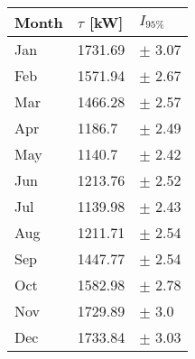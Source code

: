 \begin{tabular}{lll}
\toprule
Month & $\tau$ [kW] &   $I_{95\%}$ \\
\midrule
  Jan &     1731.69 &   $\pm$ 3.07 \\
  Feb &     1571.94 &   $\pm$ 2.67 \\
  Mar &     1466.28 &   $\pm$ 2.57 \\
  Apr &      1186.7 &   $\pm$ 2.49 \\
  May &      1140.7 &   $\pm$ 2.42 \\
  Jun &     1213.76 &   $\pm$ 2.52 \\
  Jul &     1139.98 &   $\pm$ 2.43 \\
  Aug &     1211.71 &   $\pm$ 2.54 \\
  Sep &     1447.77 &   $\pm$ 2.54 \\
  Oct &     1582.98 &   $\pm$ 2.78 \\
  Nov &     1729.89 &    $\pm$ 3.0 \\
  Dec &     1733.84 &   $\pm$ 3.03 \\
\bottomrule
\end{tabular}

